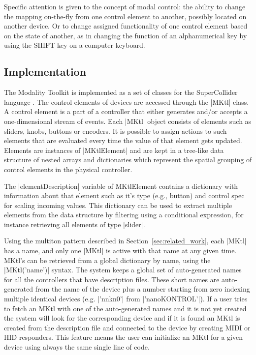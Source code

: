 \documentclass{article}
\begin{document}
Specific attention is given to the concept of modal control: the ability to change the mapping on-the-fly from one control element to another, possibly located on another device.
Or to change assigned functionality of one control element based on the state of another, as in changing the function of an alphanumerical key by using the SHIFT key on a computer keyboard.

\subsection{Implementation}
\label{sub:implementation}

The Modality Toolkit is implemented as a set of classes for the SuperCollider language \cite{mccartney2002-ret}. 
The control elements of devices are accessed through the |MKtl| class. 
A control element is a part of a controller that either generates and/or accepts a one-dimensional stream of events. 
Each |MKtl| object consists of elements such as sliders, knobs, buttons or encoders.
It is possible to assign actions to such elements that are evaluated every time the value of that element gets updated.
Elements are instances of |MKtlElement| and are kept in a tree-like data structure of nested arrays and dictionaries which represent the spatial grouping of control elements in the physical controller. 

The |elementDescription| variable of MKtlElement contains a dictionary with information about that element such as it's type (e.g., button) and control spec for scaling incoming values. 
This dictionary can be used to extract multiple elements from the data structure by filtering using a conditional expression, for instance retrieving all elements of type |slider|.

Using the multiton pattern described in Section~\ref{sec:related_work}, each |MKtl| has a name, and only one |MKtl| is active with that name at any given time. 
MKtl's can be retrieved from a global dictionary by name, using the |MKtl('name')| syntax. 
The system keeps a global set of auto-generated names for all the controllers that have description files. These short names are auto-generated from the name of the device plus a number starting from zero indexing multiple identical devices (e.g. |'nnkn0'| from |'nanoKONTROL'|). If a user tries to fetch an MKtl with one of the auto-generated names and it is not yet created the system will look for the corresponding device and if it is found an MKtl is created from the description file and connected to the device by creating MIDI or HID responders. This feature means the user can initialize an MKtl for a given device using always the same single line of code.
\end{document}
